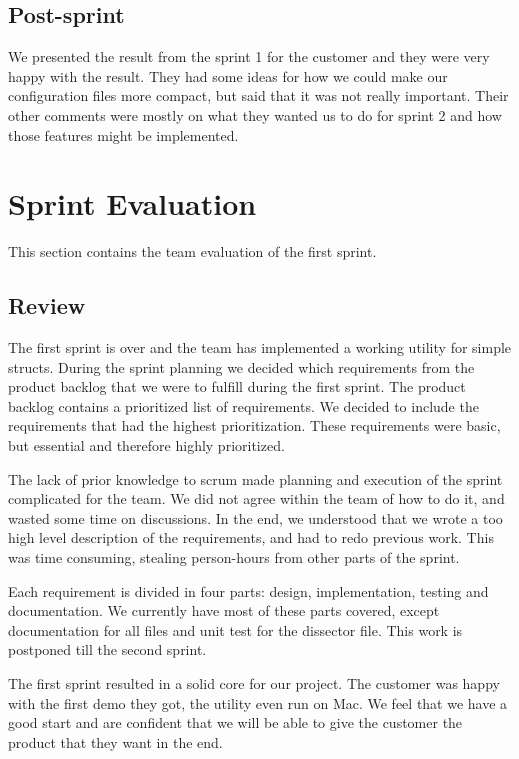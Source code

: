 \subsection{Post-sprint}
We presented the result from the sprint 1 for the customer and they were very
happy with the result. They had some ideas for how we could make our
configuration files more compact, but said that it was not really important.
Their other comments were mostly on what they wanted us to do for sprint 2
and how those features might be implemented.


\section{Sprint Evaluation}
\label{sec:sp1:eval}
This section contains the team evaluation of the first sprint.

\subsection{Review}
The first sprint is over and the team has implemented a working \gls{utility} for simple structs. During
the sprint planning we decided which requirements from the product backlog that
we were to fulfill during the first sprint. The product backlog contains a
prioritized list of requirements. We decided to include the requirements that
had the highest prioritization. These requirements were basic, but essential
and therefore highly prioritized.
   
The lack of prior knowledge to \Gls{scrum} made planning and execution of the sprint
complicated for the team. We did not agree within the team of how to do it, and
wasted some time on discussions. In the end, we understood
that we wrote a too high level description of the requirements, and had to redo
previous work. This was time consuming, stealing person-hours from other parts
of the sprint.

Each requirement is divided in four parts: design, implementation, testing and
documentation. We currently have most of these parts covered, except
documentation for all files and unit test for the \gls{dissector} file. This work is
postponed till the second sprint.

The first sprint resulted in a solid core for our project. The customer was
happy with the first demo they got, the \gls{utility} even run on Mac.
 We feel that we have a good start and are confident
that we will be able to give the customer the product that they want in the
end.

